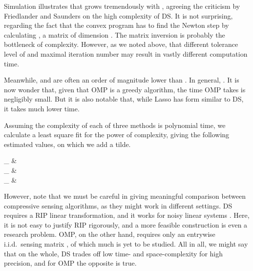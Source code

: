 Simulation illustrates that  grows tremendously with , agreeing the criticism by Friedlander and Saunders \cite {FrS07} on the high complexity of DS.
It is not surprising, regarding the fact that the convex program has to find the Newton step by calculating , a matrix of dimension .
The matrix inversion is probably the bottleneck of complexity.
However, as we noted above, that different tolerance level of and maximal iteration number may result in vastly different computation time.

Meanwhile,  and  are often an order of magnitude lower than .
In general, .
It is now wonder that, given that OMP is a greedy algorithm, the time OMP takes is negligibly small.
But it is also notable that, while Lasso has form similar to DS, it takes much lower time.

Assuming the complexity of each of three methods is polynomial time, we calculate a least square fit for the power of complexity, giving the following estimated values, on which we add a tilde.

 {
_{} \eqsim &  \\
_{} \eqsim &  \\
_{} \eqsim &  
}

However, note that we must be careful in giving meaningful comparison between compressive sensing algorithms, as they might work in different settings.
DS requires a RIP linear transformation, and it works for noisy linear systems \cite {CaT07}.
Here, it is not easy to justify RIP rigorously, and a more feasible construction is even a research problem.
OMP, on the other hand, requires only an entrywise i.i.d.\ sensing matrix \cite {TrG07a}, of which much is yet to be studied.
All in all, we might say that on the whole, DS trades off low time- and space-complexity for high precision, and for OMP the opposite is true.

